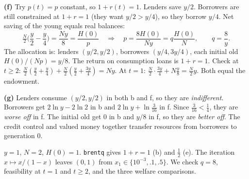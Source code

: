 \documentclass[12pt, letterpaper]{article}
\begin{document}
\begin{tcolorbox}[oddbox,title={Exercise 9.7 \quad Credit controls}]
\textbf{(f)} Try $p(t)=p$ constant, so $1+r(t)=1$. Lenders save $y/2$. Borrowers are still
constrained at $1+r=1$ (they want $y/2>y/4$), so they borrow $y/4$. Net saving of the young equals
real balances:
\[
\tfrac N2\Big(\frac y2-\frac y4\Big)=\frac{Ny}8=\frac{H(0)}p
\quad\Longrightarrow\quad p=\frac{8H(0)}{Ny}=q\frac{H(0)}N,\qquad \boxed{q=\frac8y}.
\]
The allocation is: lenders $(y/2,y/2)$, borrowers $(y/4,3y/4)$, each initial old $H(0)/(Np)=y/8$. The
return on consumption loans is $1+r=1$. Check at $t\ge2$: $\frac N2(\frac y2+\frac y4)+\frac N2(\frac
y2+\frac{3y}4)=Ny$. At $t=1$: $\frac N2\cdot\frac{3y}4+N\frac y8=\frac N2y$. Both equal the endowment.
\checkmark

\textbf{(g)} Lenders consume $(y/2,y/2)$ in both b and f, so they are \emph{indifferent}. Borrowers get
$2\ln y-2\ln2$ in b and $2\ln y+\ln\frac3{16}$ in f. Since $\frac3{16}<\frac14$, they are
\emph{worse off} in f. The initial old get $0$ in b and $y/8$ in f, so they are \emph{better off}.
The credit control and valued money together transfer resources from borrowers to generation 0.

\begin{tcolorbox}[databox]
$y=1$, $N=2$, $H(0)=1$. \texttt{brentq} gives $1+r=1$ (b) and $\tfrac12$ (e). The iteration
$x\mapsto x/(1-x)$ leaves $(0,1)$ from $x_1\in\{10^{-3},.1,.5\}$. We check $q=8$, feasibility at $t=1$
and $t\ge2$, and the three welfare comparisons.
\end{tcolorbox}
\end{tcolorbox}
\end{document}
